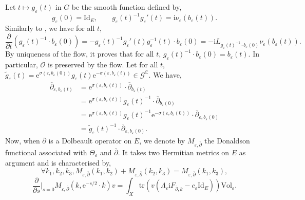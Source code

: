 \documentclass{article}
\theoremstyle{remark}
\theoremstyle{definition}
\newcommand{\C}{\mathbb{C}}
\newcommand{\tr}{\mathrm{tr}}
\newcommand{\Vol}{\mathrm{Vol}}
\newcommand{\Id}{\mathrm{Id}}
\renewcommand{\i}{\boldsymbol{\mathrm{i}}}
\newcommand{\e}{\boldsymbol{\mathrm{e}}}
\newcommand{\G}{\mathcal{G}}
\newcommand{\dbar}{\overline{\partial}}
\begin{document}
Let $t \mapsto g_\varepsilon(t)$ in $G$ be the smooth function defined by,
$$
g_\varepsilon(0) = \Id_E, \qquad g_\varepsilon(t)^{-1}g_\varepsilon'(t) = \i\nu_\varepsilon(b_\varepsilon(t)).
$$
Similarly to \cite[Lemma 3.2]{GRS}, we have for all $t$,
$$
\frac{\partial}{\partial t}(g_\varepsilon(t)^{-1} \cdot b_\varepsilon(0)) = -g_\varepsilon(t)^{-1}g_\varepsilon'(t)g_\varepsilon^{-1}(t) \cdot b_\varepsilon(0) = -\i L_{g_\varepsilon(t)^{-1} \cdot b_\varepsilon(0)}\nu_\varepsilon(b_\varepsilon(t)).
$$
By uniqueness of the flow, it proves that for all $t$, $g_\varepsilon(t)^{-1} \cdot b_\varepsilon(0) = b_\varepsilon(t)$. In particular, $\mathcal{O}$ is preserved by the flow. Let for all $t$, $\tilde{g}_\varepsilon(t) = \e^{\sigma(\varepsilon,b_\varepsilon(0))}g_\varepsilon(t)\e^{-\sigma(\varepsilon,b_\varepsilon(t))} \in \G^\C$. We have,
\begin{align}
    \dbar_{\varepsilon,b_\varepsilon(t)} & = \e^{\sigma(\varepsilon,b_\varepsilon(t))} \cdot \dbar_{b_\varepsilon(t)} \nonumber\\
    & = \e^{\sigma(\varepsilon,b_\varepsilon(t))}g_\varepsilon(t)^{-1} \cdot \dbar_{b_\varepsilon(0)} \nonumber\\
    & = \e^{\sigma(\varepsilon,b_\varepsilon(t))}g_\varepsilon(t)^{-1}\e^{-\sigma(\varepsilon,b_\varepsilon(0))} \cdot \dbar_{\varepsilon,b_\varepsilon(0)} \nonumber\\
    & = \tilde{g}_\varepsilon(t)^{-1} \cdot \dbar_{\varepsilon,b_\varepsilon(0)}. \label{EQ:dbar flux}
\end{align}
Now, when $\dbar$ is a Dolbeault operator on $E$, we denote by $M_{\varepsilon,\dbar}$ the Donaldson functional \cite[Proposition 6]{Donaldson} associated with $\Theta_\varepsilon$ and $\dbar$. It takes two Hermitian metrics on $E$ as argument and is characterised by,
\begin{equation}\label{EQ:Chasles}
    \forall k_1,k_2,k_3, M_{\varepsilon,\dbar}(k_1,k_2) + M_{\varepsilon,\dbar}(k_2,k_3) = M_{\varepsilon,\dbar}(k_1,k_3),
\end{equation}
\begin{equation}\label{EQ:Dérivée Donaldson}
    \frac{\partial}{\partial s}|_{s = 0}M_{\varepsilon,\dbar}(k,\e^{-s/2} \cdot k)v = \int_X \tr\left(v(\Lambda_\varepsilon\i F_{\dbar,k} - c_\varepsilon\Id_E)\right)\Vol_\varepsilon.
\end{equation}
\end{document}
